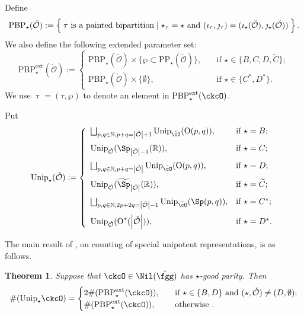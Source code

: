 \documentclass[12pt,a4paper]{amsart}
\def\abs#1{\left|{#1}\right|}
\newcommand{\BN}{{\mathbb {N}}}
\newcommand{\CO}{{\mathcal {O}}}
\newcommand{\oO}{\operatorname{O}}
\newcommand{\R}{\mathbb R}
\numberwithin{equation}{section}
\newtheorem{thm}{Theorem}[section]
\theoremstyle{remark}
\def\Unip{\mathrm{Unip}}
\def\PBPes{\mathrm{PBP}^{\mathrm{ext}}_{\star}}
\begin{document}


Define
\[
\mathrm{PBP}_\star(\check \CO):=\Set{
\tau\textrm{ is a painted bipartition}  \mid  \star_\tau = \star \text{ and } (\imath_\tau,\jmath_\tau) = (\imath_\star(\check \CO), \jmath_\star(\check \CO))
}.
\]
We also define the following extended parameter set:
\[
\PBPes(\check \CO):=\begin{cases}
\mathrm{PBP}_\star(\check \CO)\times \{\wp\subset \mathrm{PP}_\star(\check \CO)\},\quad& \textrm{if }\star\in \{B,C, D, \widetilde C\};\\
\mathrm{PBP}_\star(\check \CO)\times \{\emptyset \},\quad& \textrm{if }\star\in \{C^*, D^*\}.
\end{cases}
\]
We use $\uptau=(\tau,\wp)$ to denote an element in $\PBPes(\ckcO)$.

Put
\[
  \mathrm{Unip}_{\star}(\check \CO):=\left\{
     \begin{array}{ll}
         \bigsqcup_{p,q\in \BN, p+q=\abs{\check \CO}+1} \Unip_{\check \cO}(\oO(p,q)), &\hbox{if $\star=B$}; \medskip\\
           \Unip_{\check \CO}(\Sp_{\abs{\check \CO}-1}(\R)), &\hbox{if $\star=C$}; \medskip\\
           \bigsqcup_{p,q\in \BN, p+q=\abs{\check \CO}} \Unip_{\check \cO}(\oO(p,q)), &\hbox{if $\star=D$}; \medskip\\
          \Unip_{\check \CO}(\widetilde \Sp_{\abs{\check \CO}}(\R)), &\hbox{if $\star=\widetilde{ C}$}; \medskip \\
     \bigsqcup_{p,q\in \BN, 2p+2q=\abs{\check \CO}-1} \Unip_{\check \cO}(\Sp(p,q)), &\hbox{if $\star=C^*$}; \medskip \\
          \Unip_{\check \CO} (\oO^*(\abs{\check \CO})), &\hbox{if $\star=D^*$}.\\
            \end{array}
   \right.
\]

The main result of \cite{BMSZ2}, on counting of special unipotent representations, is as follows.

\begin{thm}\label{thmcount}
Suppose that $\ckcO\in \Nil(\check\fgg)$ has $\star$-good parity. Then
\[
 \#(\Unip_{\star}{\ckcO})= \begin{cases}
2  \#(\PBPes(\ckcO)),&\quad  \text{if  $\star\in \{B,D\}$ and $(\star, \check \CO)\neq (D, \emptyset)$;}\\
 \#(\PBPes(\ckcO)),  &\quad  \text{otherwise }.\\
\end{cases}
\]
\end{thm}
\end{document}
